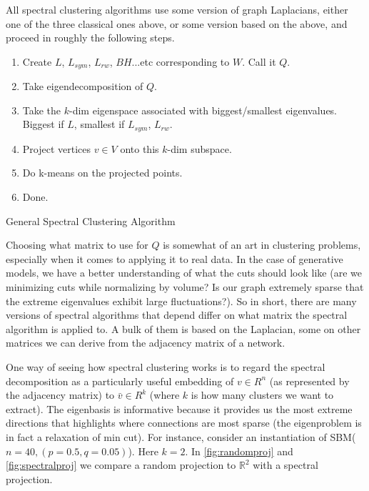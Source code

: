 All spectral clustering algorithms use some version of graph Laplacians, either one of the three classical ones above, or some version based on the above, and proceed in roughly the following steps.  

\begin{algorithm}[H]
 \begin{enumerate}
    \item Create $L$, $L_{sym}$, $L_{rw}$, $BH$...etc corresponding to $W$.  Call it $Q$. 
    \item Take eigendecomposition of $Q$.  
    \item Take the $k$-dim eigenspace associated with biggest/smallest eigenvalues.  Biggest if $L$, smallest if $L_{sym}$, $L_{rw}$.  
    \item Project vertices $v \in V$ onto this $k$-dim subspace.
    \item Do k-means on the projected points. 
    \item Done. 
 \end{enumerate}
 \caption{General Spectral Clustering Algorithm}
\end{algorithm}


Choosing what matrix to use for $Q$ is somewhat of an art in clustering problems, especially when it comes to applying it to real data.  In the case of generative models, we have a better understanding of what the cuts should look like (are we minimizing cuts while normalizing by volume?  Is our graph extremely sparse that the extreme eigenvalues exhibit large fluctuations?).  So in short, there are many versions of spectral algorithms that depend differ on what matrix the spectral algorithm is applied to.  A bulk of them is based on the Laplacian, some on other matrices we can derive from the adjacency matrix of a network. 

One way of seeing how spectral clustering works is to regard the spectral decomposition as a particularly useful embedding of $v \in R^n$ (as represented by the adjacency matrix) to $\bar{v} \in R^k$ (where $k$ is how many clusters we want to extract).  The eigenbasis is informative because it provides us the most extreme directions that highlights where connections are most sparse (the eigenproblem is in fact a relaxation of min cut).  For instance, consider an instantiation of SBM($n =40, (p = 0.5, q = 0.05)$).  Here $k = 2$.  In \ref{fig:randomproj} and \ref{fig:spectralproj} we compare a random projection to $\mathbb{R}^2$ with a spectral projection.  

